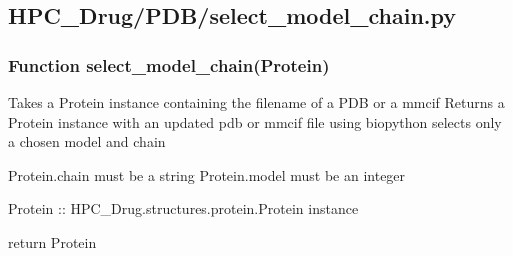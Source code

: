 

\subsection{HPC\_Drug/PDB/select\_model\_chain.py}

    \subsubsection{Function select\_model\_chain(Protein)}

        Takes a Protein instance containing the filename of a PDB or a mmcif
        Returns a Protein instance with an updated pdb or mmcif file
        using biopython
        selects only a chosen model and chain

        Protein.chain must be a string
        Protein.model must be an integer

        Protein :: HPC\_Drug.structures.protein.Protein instance

        return Protein